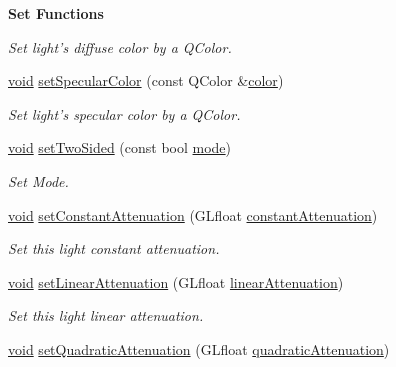 \begin{Indent}{\bf Set Functions}
\begin{DoxyCompactItemize}
\begin{DoxyCompactList}\small\item\em Set light's diffuse color by a Q\-Color. \end{DoxyCompactList}\item 
\hyperlink{group___u_a_v_objects_plugin_ga444cf2ff3f0ecbe028adce838d373f5c}{void} \hyperlink{class_g_l_c___light_af09337a82a3b7f54d02fcd6beb97765e}{set\-Specular\-Color} (const Q\-Color \&\hyperlink{glext_8h_a3ea846f998d64f079b86052b6c4193a8}{color})
\begin{DoxyCompactList}\small\item\em Set light's specular color by a Q\-Color. \end{DoxyCompactList}\item 
\hyperlink{group___u_a_v_objects_plugin_ga444cf2ff3f0ecbe028adce838d373f5c}{void} \hyperlink{class_g_l_c___light_a809335d00ef10909669e8884b688e7da}{set\-Two\-Sided} (const bool \hyperlink{glext_8h_a1e71d9c196e4683cc06c4b54d53f7ef5}{mode})
\begin{DoxyCompactList}\small\item\em Set Mode. \end{DoxyCompactList}\item 
\hyperlink{group___u_a_v_objects_plugin_ga444cf2ff3f0ecbe028adce838d373f5c}{void} \hyperlink{class_g_l_c___light_a1792ead634c12c9ec550e20762950338}{set\-Constant\-Attenuation} (G\-Lfloat \hyperlink{class_g_l_c___light_ac2206e42a1100b0ed372009c88eb956a}{constant\-Attenuation})
\begin{DoxyCompactList}\small\item\em Set this light constant attenuation. \end{DoxyCompactList}\item 
\hyperlink{group___u_a_v_objects_plugin_ga444cf2ff3f0ecbe028adce838d373f5c}{void} \hyperlink{class_g_l_c___light_a98e0ed4a47e3b63b3ab7c948e2af4008}{set\-Linear\-Attenuation} (G\-Lfloat \hyperlink{class_g_l_c___light_a38480562144c14ca8f1e2b9379757665}{linear\-Attenuation})
\begin{DoxyCompactList}\small\item\em Set this light linear attenuation. \end{DoxyCompactList}\item 
\hyperlink{group___u_a_v_objects_plugin_ga444cf2ff3f0ecbe028adce838d373f5c}{void} \hyperlink{class_g_l_c___light_abd74d4c10e11cfeaf9451d5737eecc94}{set\-Quadratic\-Attenuation} (G\-Lfloat \hyperlink{class_g_l_c___light_a48f7482111079034f8dca2018f6cc4cc}{quadratic\-Attenuation})

\end{DoxyCompactItemize}
\end{Indent}
